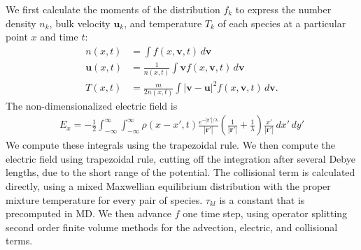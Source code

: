 \documentclass{article}
\begin{document}
We first calculate the moments of the distribution $f_k$ to express the number density $n_k$, bulk velocity $\mathbf{u}_k$, and temperature $T_k$ of each species at a particular point $x$ and time $t$:
\begin{align}
n(x,t)&=\int f(x,\mathbf{v},t)\,d\mathbf{v}\\
\mathbf{u}(x,t)&=\frac{1}{n(x,t)}\int \mathbf{v}f(x,\mathbf{v},t)\,d\mathbf{v}\\
T(x,t)&=\frac{m}{2n(x,t)}\int |\mathbf{v}-\mathbf{u}|^2f(x,\mathbf{v},t)\,d\mathbf{v}.
\end{align}The non-dimensionalized electric field is
\begin{align}
E_x=-\frac{1}{2}\int_{-\infty}^\infty\int_{-\infty}^\infty\rho(x-x',t)\frac{e^{-|\mathbf{r}'|/\lambda}}{|\mathbf{r}'|}\left(\frac{1}{|\mathbf{r}'|}+\frac{1}{\lambda}\right)\frac{x'}{|\mathbf{r}'|}\,dx'\,dy'
\end{align}
We compute these integrals using the trapezoidal rule. We then compute the electric field using trapezoidal rule, cutting off the integration after several Debye lengths, due to the short range of the potential. The collisional term is calculated directly, using a mixed Maxwellian equilibrium distribution with the proper mixture temperature for every pair of species. $\tau_{kl}$ is a constant that is precomputed in MD. We then advance $f$ one time step, using operator splitting second order finite volume methods for the advection, electric, and collisional terms. 
\end{document}

